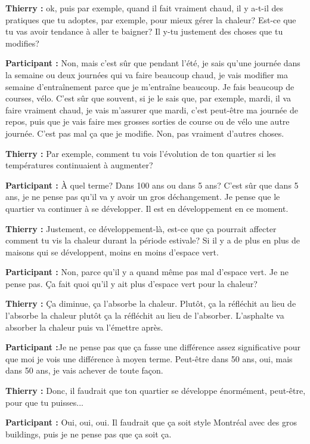 \textbf{Thierry :} ok, puis par exemple, quand il fait vraiment chaud, il y a-t-il des pratiques que tu adoptes, par exemple, pour mieux gérer la chaleur? Est-ce que tu vas avoir tendance à aller te baigner? Il y-tu justement des choses que tu modifies?

\textbf{Participant :} Non, mais c'est sûr que pendant l'été, je sais qu'une journée dans la semaine ou deux journées qui va faire beaucoup chaud, je vais modifier ma semaine d'entraînement parce que je m'entraîne beaucoup. Je fais beaucoup de courses, vélo. C'est sûr que souvent, si je le sais que, par exemple, mardi, il va faire vraiment chaud, je vais m'assurer que mardi, c'est peut-être ma journée de repos, puis que je vais faire mes grosses sorties de course ou de vélo une autre journée. C'est pas mal ça que je modifie. Non, pas vraiment d'autres choses.

\textbf{Thierry :} Par exemple, comment tu vois l'évolution de ton quartier si les températures continuaient à augmenter? 

\textbf{Participant :} À quel terme? Dans 100 ans ou dans 5 ans? C'est sûr que dans 5 ans, je ne pense pas qu'il va y avoir un gros déchangement. Je pense que le quartier va continuer à se développer. Il est en développement en ce moment.

\textbf{Thierry :} Justement, ce développement-là, est-ce que ça pourrait affecter comment tu vis la chaleur durant la période estivale? Si il y a de plus en plus de maisons qui se développent, moins en moins d'espace vert.

\textbf{Participant :} Non, parce qu'il y a quand même pas mal d'espace vert. Je ne pense pas. Ça fait quoi qu'il y ait plus d'espace vert pour la chaleur?

\textbf{Thierry :} Ça diminue, ça l'absorbe la chaleur. Plutôt, ça la réfléchit au lieu de l'absorbe la chaleur plutôt ça la réfléchit au lieu de l'absorber. L'asphalte va absorber la chaleur puis va l'émettre après. 

\textbf{Participant :}Je ne pense pas que ça fasse une différence assez significative pour que moi je vois une différence à moyen terme. Peut-être dans 50 ans, oui, mais dans 50 ans, je vais achever de toute façon.

\textbf{Thierry :} Donc, il faudrait que ton quartier se développe énormément, peut-être, pour que tu puisses... 

\textbf{Participant :} Oui, oui, oui. Il faudrait que ça soit style Montréal avec des gros buildings, puis je ne pense pas que ça soit ça.


